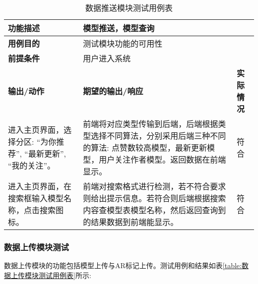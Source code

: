 \begin{table}[H]
  \centering
  \small
  \renewcommand\arraystretch{1.1}
  \caption{数据推送模块测试用例表}
  \label{table:数据推送模块测试用例表}
  \setlength{\tabcolsep}{4mm}
  \begin{tabular}{|p{4.5cm}|p{6.5cm}|p{1.5cm}|}
    \hline \textbf{功能描述} & \multicolumn{2}{l|}{模型推送，模型查询} \\
    \hline \textbf{用例目的} & \multicolumn{2}{l|}{测试模块功能的可用性} \\
    \hline \textbf{前提条件} & \multicolumn{2}{l|}{用户进入系统} \\
    \hline \textbf{输出/动作} & \textbf{期望的输出/响应} & \textbf{实际情况} \\
    \hline 进入主页界面，选择分区: “为你推荐”, “最新更新”, “我的关注”。 & 前端将对应类型传输到后端，后端根据类型选择不同算法，分别采用后端三种不同的算法: 点赞数较高模型，最新更新模型，用户关注作者模型。返回数据在前端显示。 & 符合  \\
    \hline 进入主页界面，在搜索框输入模型名称，点击搜索图标。 & 前端对搜索格式进行检测，若不符合要求则给出提示信息。若符合则后端根据搜索内容查模型表模型名称，然后返回查询到的结果数据到前端能显示。 & 符合  \\
    \hline
  \end{tabular}
\end{table}

\subsubsection{数据上传模块测试}

数据上传模块的功能包括模型上传与AR标记上传。测试用例和结果如表\ref{table:数据上传模块测试用例表}所示:

